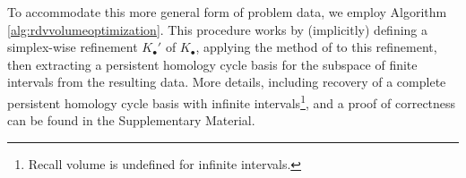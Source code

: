 
To accommodate this more general form of problem data, we employ Algorithm \ref{alg:rdvvolumeoptimization}.  This procedure works by (implicitly) defining a simplex-wise refinement $K_\bullet'$ of $K_\bullet$, applying the method of \cite{Obayashi2018} to this refinement, then extracting a persistent homology cycle basis for the subspace of finite intervals from the resulting data.
More details, including recovery of a complete persistent homology cycle basis with infinite intervals\footnote{Recall volume is undefined for infinite intervals.}, and a proof of correctness can be found in the Supplementary Material.

